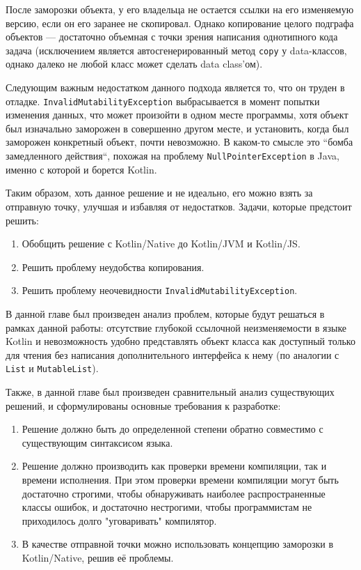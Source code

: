 \documentclass[specification,annotation,times]{itmo-student-thesis}
\begin{document}
После заморозки объекта, у его владельца не остается ссылки на его изменяемую версию, если он его заранее не скопировал.
Однако копирование целого подграфа объектов –-- достаточно объемная с точки зрения написания однотипного кода задача (исключением является автосгенерированный метод \texttt{copy} у data-классов, однако далеко не любой класс может сделать data class'ом).

Следующим важным недостатком данного подхода является то, что он труден в отладке.
\texttt{InvalidMutabilityException} выбрасывается в момент попытки изменения данных, что может произойти в одном месте программы, хотя объект был изначально заморожен в совершенно другом месте, и установить, когда был заморожен конкретный объект, почти невозможно.
В каком-то смысле это ``бомба замедленного действия``, похожая на проблему \texttt{NullPointerException} в Java, именно с которой и борется Kotlin.

Таким образом, хоть данное решение и не идеально, его можно взять за отправную точку, улучшая и избавляя от недостатков. Задачи, которые предстоит решить:

\begin{enumerate}
	\item Обобщить решение с Kotlin/Native до Kotlin/JVM и Kotlin/JS.
	\item Решить проблему неудобства копирования.
	\item Решить проблему неочевидности \texttt{InvalidMutabilityException}.
\end{enumerate}


\startrelatedwork
\finishrelatedwork

\chapterconclusion

В данной главе был произведен анализ проблем, которые будут решаться в рамках данной работы: отсутствие глубокой ссылочной неизменяемости в языке Kotlin и невозможность удобно представлять объект класса как доступный только для чтения без написания дополнительного интерфейса к нему (по аналогии с \texttt{List} и \texttt{MutableList}).

Также, в данной главе был произведен сравнительный анализ существующих решений, и сформулированы основные требования к разработке:

\begin{enumerate}
	\item Решение должно быть до определенной степени обратно совместимо с существующим синтаксисом языка.
	\item Решение должно производить как проверки времени компиляции, так и времени исполнения. При этом проверки времени компиляции могут быть достаточно строгими, чтобы обнаруживать наиболее распространенные классы ошибок, и достаточно нестрогими, чтобы программистам не приходилось долго "уговаривать" компилятор.  %
	\item В качестве отправной точки можно использовать концепцию заморозки в Kotlin/Native, решив её проблемы.
\end{enumerate}
\end{document}
